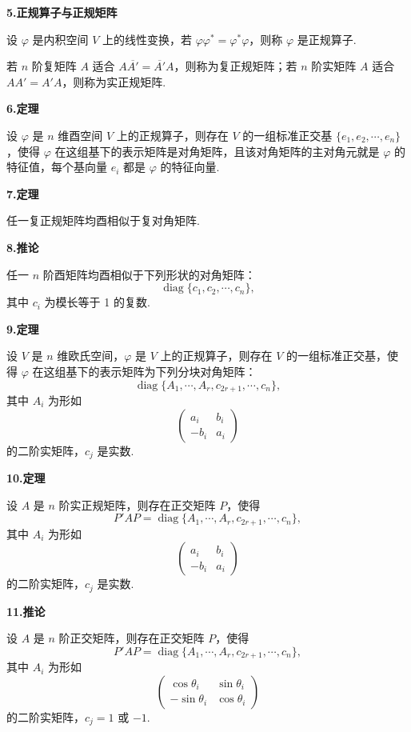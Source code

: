 \documentclass[UTF8,12pt,a4paper,fontset=fandol]{ctexart}
\begin{document}
\noindent\textbf{5.\quad 正规算子与正规矩阵}

设 $\varphi$ 是内积空间 $V$ 上的线性变换，若 $\varphi\varphi^*=\varphi^*\varphi$，则称 $\varphi$ 是正规算子.

若 $n$ 阶复矩阵 $A$ 适合 $A\overline{A'}=\overline{A'}A$，则称为复正规矩阵；若 $n$ 阶实矩阵 $A$ 适合 $AA'=A'A$，则称为实正规矩阵.

\noindent\textbf{6.\quad 定理}

设 $\varphi$ 是 $n$ 维酉空间 $V$ 上的正规算子，则存在 $V$ 的一组标准正交基 $\{e_1,e_2,\cdots,e_n\}$，使得 $\varphi$ 在这组基下的表示矩阵是对角矩阵，且该对角矩阵的主对角元就是 $\varphi$ 的特征值，每个基向量 $e_i$ 都是 $\varphi$ 的特征向量.

\noindent\textbf{7.\quad 定理}

任一复正规矩阵均酉相似于复对角矩阵.

\noindent\textbf{8.\quad 推论}

任一 $n$ 阶酉矩阵均酉相似于下列形状的对角矩阵：
\[
\operatorname{diag}\{c_1,c_2,\cdots,c_n\},
\]
其中 $c_i$ 为模长等于 1 的复数.

\noindent\textbf{9.\quad 定理}

设 $V$ 是 $n$ 维欧氏空间，$\varphi$ 是 $V$ 上的正规算子，则存在 $V$ 的一组标准正交基，使得 $\varphi$ 在这组基下的表示矩阵为下列分块对角矩阵：
\begin{equation}
\operatorname{diag}\{A_1,\cdots,A_r,c_{2r+1},\cdots,c_n\},
\tag{9.1}
\end{equation}
其中 $A_i$ 为形如
\[
\begin{pmatrix}
a_i & b_i\\
-b_i & a_i
\end{pmatrix}
\]
的二阶实矩阵，$c_j$ 是实数.

\noindent\textbf{10.\quad 定理}

设 $A$ 是 $n$ 阶实正规矩阵，则存在正交矩阵 $P$，使得
\[
P'AP=\operatorname{diag}\{A_1,\cdots,A_r,c_{2r+1},\cdots,c_n\},
\]
其中 $A_i$ 为形如
\[
\begin{pmatrix}
a_i & b_i\\
-b_i & a_i
\end{pmatrix}
\]
的二阶实矩阵，$c_j$ 是实数.

\noindent\textbf{11.\quad 推论}

设 $A$ 是 $n$ 阶正交矩阵，则存在正交矩阵 $P$，使得
\[
P'AP=\operatorname{diag}\{A_1,\cdots,A_r,c_{2r+1},\cdots,c_n\},
\]
其中 $A_i$ 为形如
\[
\begin{pmatrix}
\cos\theta_i & \sin\theta_i\\
-\sin\theta_i & \cos\theta_i
\end{pmatrix}
\]
的二阶实矩阵，$c_j=1$ 或 $-1$.
\end{document}
